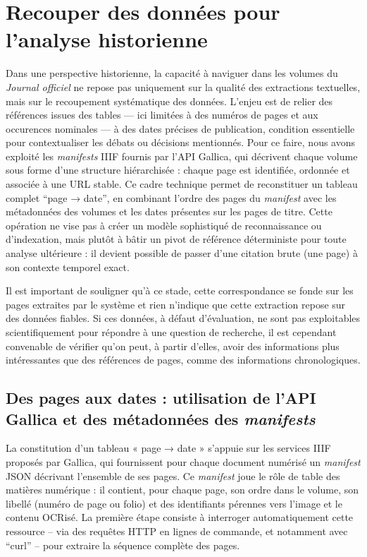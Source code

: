 \section{Recouper des données pour l'analyse historienne}

Dans une perspective historienne, la capacité à naviguer dans les volumes du \emph{Journal officiel} ne repose pas uniquement sur la qualité des extractions textuelles, mais sur le recoupement systématique des données. L’enjeu est de relier des références issues des tables — ici limitées à des numéros de pages et aux occurences nominales — à des dates précises de publication, condition essentielle pour contextualiser les débats ou décisions mentionnés. Pour ce faire, nous avons exploité les \emph{manifests} IIIF fournis par l’API Gallica, qui décrivent chaque volume sous forme d’une structure hiérarchisée : chaque page est identifiée, ordonnée et associée à une URL stable. Ce cadre technique permet de reconstituer un tableau complet \enquote{page → date}, en combinant l’ordre des pages du \emph{manifest} avec les métadonnées des volumes et les dates présentes sur les pages de titre. Cette opération ne vise pas à créer un modèle sophistiqué de reconnaissance ou d’indexation, mais plutôt à bâtir un pivot de référence déterministe pour toute analyse ultérieure : il devient possible de passer d’une citation brute (une page) à son contexte temporel exact. 

Il est important de souligner qu'à ce stade, cette correspondance se fonde sur les pages extraites par le système et rien n'indique que cette extraction repose sur des données fiables. Si ces données, à défaut d'évaluation, ne sont pas exploitables scientifiquement pour répondre à une question de recherche, il est cependant convenable de vérifier qu'on peut, à partir d'elles, avoir des informations plus intéressantes que des références de pages, comme des informations chronologiques.

\subsection{Des pages aux dates : utilisation de l'API Gallica et des métadonnées des \emph{manifests}}

La constitution d’un tableau « page → date » s’appuie sur les services IIIF proposés par Gallica, qui fournissent pour chaque document numérisé un \emph{manifest} JSON décrivant l’ensemble de ses pages. Ce \emph{manifest} joue le rôle de table des matières numérique : il contient, pour chaque page, son ordre dans le volume, son libellé (numéro de page ou folio) et des identifiants pérennes vers l’image et le contenu OCRisé. La première étape consiste à interroger automatiquement cette ressource -- via des requêtes HTTP en lignes de commande, et notamment avec \enquote{curl} -- pour extraire la séquence complète des pages.

